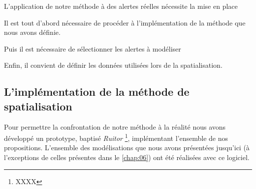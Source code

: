 L’application de notre méthode à des alertes réelles nécessite la mise
en place  

Il est tout d'abord nécessaire de procéder à l'implémentation de la
méthode que nous avons définie.

Puis il est nécessaire de sélectionner les alertes à modéliser

Enfin, il convient de définir les données utilisées lors de la
spatialisation.

\subsection{L'implémentation de la méthode de spatialisation}

Pour permettre la confrontation de notre méthode à la réalité nous
avons développé un prototype, baptisé \emph{Ruitor} \footnote{XXXX},
implémentant l'ensemble de nos propositions.
%
L'ensemble des modélisations que nous avons présentées jusqu'ici (à
l'exceptions de celles présentes dans le \autoref{chap:06}) ont été
réalisées avec ce logiciel.

